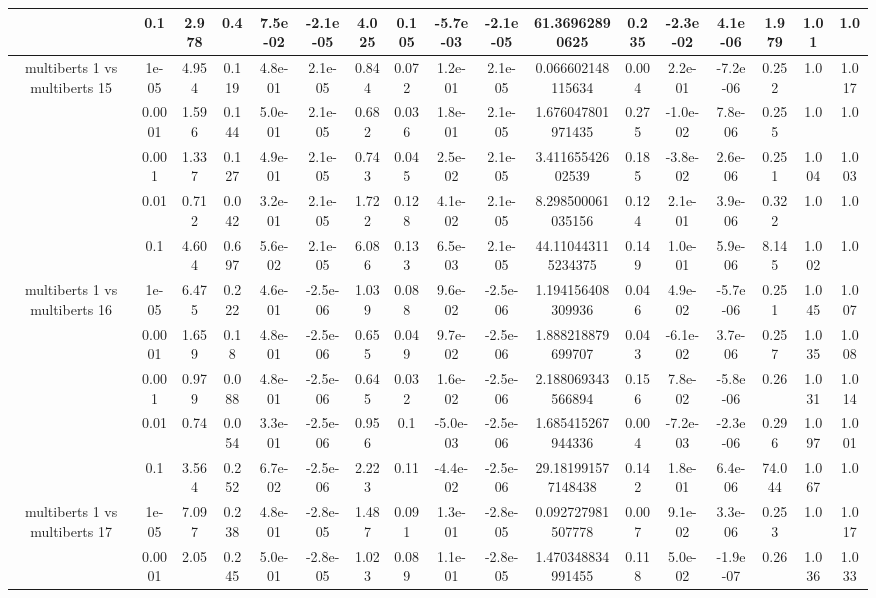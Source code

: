 \begin{tabular}{|c|c|c|c|c|c|c|c|c|c|c|c|c|c|c|c|c|}
 & 0.1 & 2.978 & 0.4 & 7.5e-02 & -2.1e-05 & 4.025 & 0.105 & -5.7e-03 & -2.1e-05 & 61.36962890625 & 0.235 & -2.3e-02 & 4.1e-06 & 1.979 & 1.01 & 1.0 \\
\hline
\multirow{5}{*}{multiberts 1 vs multiberts 15} & 1e-05 & 4.954 & 0.119 & 4.8e-01 & 2.1e-05 & 0.844 & 0.072 & 1.2e-01 & 2.1e-05 & 0.066602148115634 & 0.004 & 2.2e-01 & -7.2e-06 & 0.252 & 1.0 & 1.017 \\
 & 0.0001 & 1.596 & 0.144 & 5.0e-01 & 2.1e-05 & 0.682 & 0.036 & 1.8e-01 & 2.1e-05 & 1.676047801971435 & 0.275 & -1.0e-02 & 7.8e-06 & 0.255 & 1.0 & 1.0 \\
 & 0.001 & 1.337 & 0.127 & 4.9e-01 & 2.1e-05 & 0.743 & 0.045 & 2.5e-02 & 2.1e-05 & 3.41165542602539 & 0.185 & -3.8e-02 & 2.6e-06 & 0.251 & 1.004 & 1.003 \\
 & 0.01 & 0.712 & 0.042 & 3.2e-01 & 2.1e-05 & 1.722 & 0.128 & 4.1e-02 & 2.1e-05 & 8.298500061035156 & 0.124 & 2.1e-01 & 3.9e-06 & 0.322 & 1.0 & 1.0 \\
 & 0.1 & 4.604 & 0.697 & 5.6e-02 & 2.1e-05 & 6.086 & 0.133 & 6.5e-03 & 2.1e-05 & 44.110443115234375 & 0.149 & 1.0e-01 & 5.9e-06 & 8.145 & 1.002 & 1.0 \\
\hline
\multirow{5}{*}{multiberts 1 vs multiberts 16} & 1e-05 & 6.475 & 0.222 & 4.6e-01 & -2.5e-06 & 1.039 & 0.088 & 9.6e-02 & -2.5e-06 & 1.194156408309936 & 0.046 & 4.9e-02 & -5.7e-06 & 0.251 & 1.045 & 1.007 \\
 & 0.0001 & 1.659 & 0.18 & 4.8e-01 & -2.5e-06 & 0.655 & 0.049 & 9.7e-02 & -2.5e-06 & 1.888218879699707 & 0.043 & -6.1e-02 & 3.7e-06 & 0.257 & 1.035 & 1.008 \\
 & 0.001 & 0.979 & 0.088 & 4.8e-01 & -2.5e-06 & 0.645 & 0.032 & 1.6e-02 & -2.5e-06 & 2.188069343566894 & 0.156 & 7.8e-02 & -5.8e-06 & 0.26 & 1.031 & 1.014 \\
 & 0.01 & 0.74 & 0.054 & 3.3e-01 & -2.5e-06 & 0.956 & 0.1 & -5.0e-03 & -2.5e-06 & 1.685415267944336 & 0.004 & -7.2e-03 & -2.3e-06 & 0.296 & 1.097 & 1.001 \\
 & 0.1 & 3.564 & 0.252 & 6.7e-02 & -2.5e-06 & 2.223 & 0.11 & -4.4e-02 & -2.5e-06 & 29.181991577148438 & 0.142 & 1.8e-01 & 6.4e-06 & 74.044 & 1.067 & 1.0 \\
\hline
\multirow{5}{*}{multiberts 1 vs multiberts 17} & 1e-05 & 7.097 & 0.238 & 4.8e-01 & -2.8e-05 & 1.487 & 0.091 & 1.3e-01 & -2.8e-05 & 0.092727981507778 & 0.007 & 9.1e-02 & 3.3e-06 & 0.253 & 1.0 & 1.017 \\
 & 0.0001 & 2.05 & 0.245 & 5.0e-01 & -2.8e-05 & 1.023 & 0.089 & 1.1e-01 & -2.8e-05 & 1.470348834991455 & 0.118 & 5.0e-02 & -1.9e-07 & 0.26 & 1.036 & 1.033 \\

\end{tabular}
